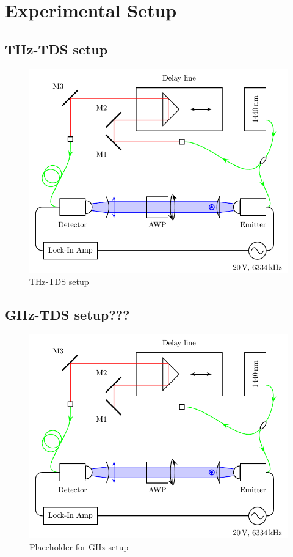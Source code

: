 \section{Experimental Setup}

\subsection{THz-TDS setup}
\begin{figure}[h]
    \centering
    \includegraphics{images/3_chapter03/Setup1_TDS.pdf}
    \caption{THz-TDS setup}
    \label{fig:THz_setup}
\end{figure}


\subsection{GHz-TDS setup???}
\begin{figure}[h]
    \centering
    \includegraphics{images/3_chapter03/Setup1_TDS.pdf}
    \caption{Placeholder for GHz setup}
    \label{fig:GHz_setup}
\end{figure}

